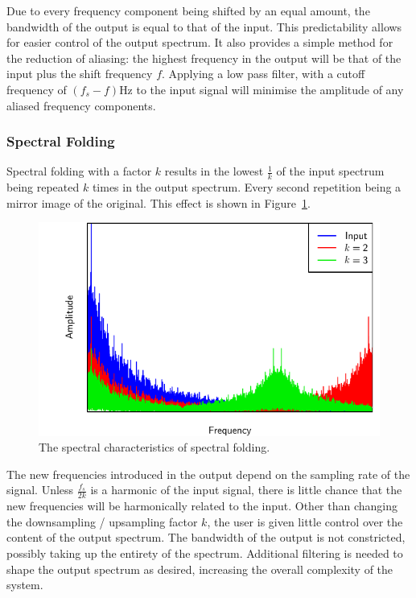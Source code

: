 			Due to every frequency component being shifted by an equal amount, the bandwidth of the output is
			equal to that of the input. This predictability allows for easier control of the output spectrum.
			It also provides a simple method for the reduction of aliasing: the highest frequency in the output
			will be that of the input plus the shift frequency $f$. Applying a low pass filter, with a cutoff
			frequency of $(f_{s} - f)$Hz to the input signal will minimise the amplitude of any aliased
			frequency components.

		\subsubsection*{Spectral Folding}
			Spectral folding with a factor $k$ results in the lowest $\frac{1}{k}$ of the input spectrum being
			repeated $k$ times in the output spectrum. Every second repetition being a mirror image of the
			original. This effect is shown in Figure~\ref{fig:SpectralFolding}. 
			
			\begin{figure}[h!]
				\centering
				\includegraphics{chapter5/Images/SpectralFoldingSpectrum.pdf}
				\caption{The spectral characteristics of spectral folding.}
				\label{fig:SpectralFolding}
			\end{figure}

			The new frequencies introduced in the output depend on the sampling rate of the signal. Unless
			$\frac{f_{s}}{2k}$ is a harmonic of the input signal, there is little chance that the new
			frequencies will be harmonically related to the input. Other than changing the downsampling /
			upsampling factor $k$, the user is given little control over the content of the output spectrum.
			The bandwidth of the output is not constricted, possibly taking up the entirety of the spectrum.
			Additional filtering is needed to shape the output spectrum as desired, increasing the overall
			complexity of the system.

